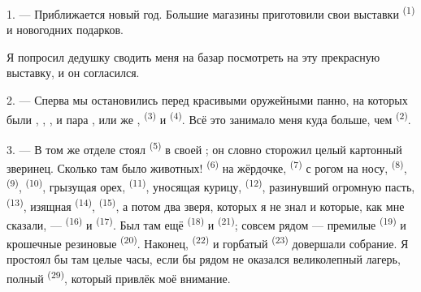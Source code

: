 %

\VUsaut{4.0mm}
\VUsaut{2.0mm}
\VUsaut{3.4mm}

1. --- Приближается новый год. Большие магазины приготовили свои выставки
 \textsuperscript{(1)} и новогодних подарков.

Я попросил дедушку сводить меня на базар посмотреть на эту прекрасную
выставку, и он согласился.

2. --- Сперва мы остановились перед красивыми оружейными панно, на которых
были , , ,  и
пара , или же ,  \textsuperscript{(3)}
и  \textsuperscript{(4)}. Всё это занимало меня куда больше, чем
 \textsuperscript{(2)}.

\VUsaut{3.0mm}
\VUsaut{2.6mm}

3. --- В том же отделе стоял  \textsuperscript{(5)} в своей
; он словно сторожил целый картонный зверинец. Сколько там
было животных!  \textsuperscript{(6)} на жёрдочке,
 \textsuperscript{(7)} с рогом на носу, 
\textsuperscript{(8)},  \textsuperscript{(9)}, 
\textsuperscript{(10)}, грызущая орех,  \textsuperscript{(11)}, уносящая
курицу,  \textsuperscript{(12)}, разинувший огромную пасть,
 \textsuperscript{(13)}, изящная  \textsuperscript{(14)},
 \textsuperscript{(15)}, а потом два зверя, которых я не знал и
которые, как мне сказали, ---  \textsuperscript{(16)} и
 \textsuperscript{(17)}. Был там ещё  \textsuperscript{(18)}
и  \textsuperscript{(21)}; совсем рядом --- премилые 
\textsuperscript{(19)} и крошечные резиновые  \textsuperscript{(20)}.
Наконец,  \textsuperscript{(22)} и горбатый 
\textsuperscript{(23)} довершали собрание. Я простоял бы там целые часы, если бы
рядом не оказался великолепный лагерь, полный 
\textsuperscript{(29)}, который привлёк моё внимание.

